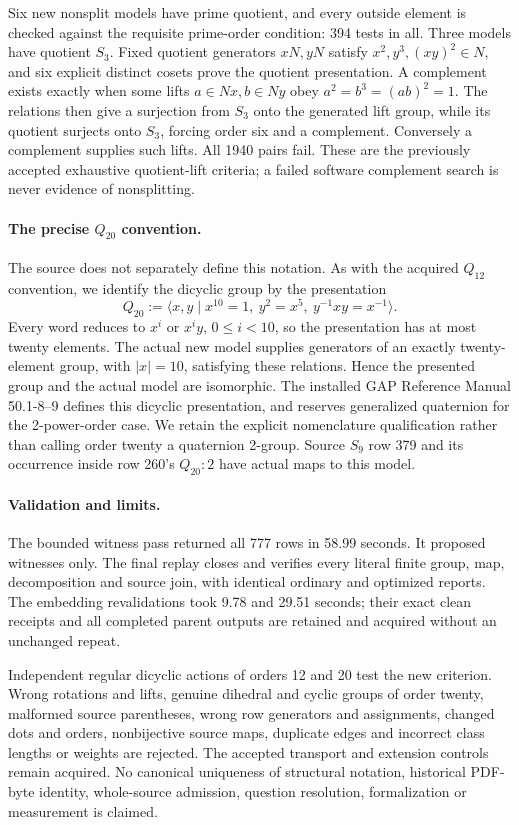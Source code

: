 \documentclass[11pt]{article}
\begin{document}
Six new nonsplit models have prime quotient, and every outside element
is checked against the requisite prime-order condition: 394 tests in all.
Three models have quotient $S_3$. Fixed quotient generators $xN,yN$
satisfy $x^2,y^3,(xy)^2\in N$, and six explicit distinct cosets prove the
quotient presentation. A complement exists exactly when some lifts
$a\in Nx,b\in Ny$ obey $a^2=b^3=(ab)^2=1$. The relations then give a
surjection from $S_3$ onto the generated lift group, while its quotient
surjects onto $S_3$, forcing order six and a complement. Conversely a
complement supplies such lifts. All 1940 pairs fail. These are the
previously accepted exhaustive quotient-lift criteria; a failed software
complement search is never evidence of nonsplitting.

\paragraph{The precise $Q_{20}$ convention.}
The source does not separately define this notation. As with the acquired
$Q_{12}$ convention, we identify the dicyclic group by the presentation
\[
 Q_{20}:=\langle x,y\mid x^{10}=1,\ y^2=x^5,
                   \ y^{-1}xy=x^{-1}\rangle.
\]
Every word reduces to $x^i$ or $x^iy$, $0\leq i<10$, so the presentation
has at most twenty elements. The actual new model supplies generators
of an exactly twenty-element group, with $|x|=10$, satisfying these
relations. Hence the presented group and the actual model are isomorphic.
The installed GAP Reference Manual 50.1-8--9 defines this dicyclic
presentation, and reserves generalized quaternion for the 2-power-order
case. We retain the explicit nomenclature qualification rather than
calling order twenty a quaternion 2-group. Source $S_9$ row 379 and its
occurrence inside row 260's $Q_{20}:2$ have actual maps to this model.

\paragraph{Validation and limits.}
The bounded witness pass returned all 777 rows in 58.99 seconds.
It proposed witnesses only. The final replay closes and verifies every
literal finite group, map, decomposition and source join, with identical
ordinary and optimized reports. The embedding revalidations took 9.78 and
29.51 seconds; their exact clean receipts and all completed parent outputs
are retained and acquired without an unchanged repeat.

Independent regular dicyclic actions of orders 12 and 20 test the new
criterion. Wrong rotations and lifts, genuine dihedral and cyclic groups
of order twenty, malformed source parentheses, wrong row generators and
assignments, changed dots and orders, nonbijective source maps, duplicate
edges and incorrect class lengths or weights are rejected. The accepted
transport and extension controls remain acquired. No canonical uniqueness
of structural notation, historical PDF-byte identity, whole-source
admission, question resolution, formalization or measurement is claimed.
\end{document}
